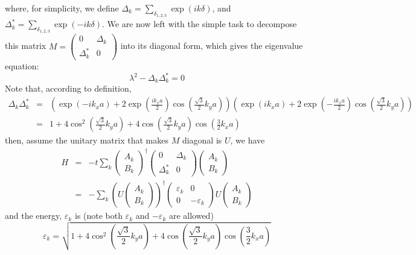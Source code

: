 \documentclass{article}
\begin{document}
where, for simplicity, we define $\Delta_k = \underset{\delta_{1, 2, 3}}{\sum} \exp (i k \delta)$, and $\Delta^{\ast}_k = \underset{\delta_{1, 2, 3}}{\sum} \exp (- i k \delta)$.
We are now left with the simple task to decompose this matrix $M = \left(\begin{array}{cc}  0 & \Delta_k\\  \Delta^{\ast}_k & 0\end{array}\right)$ into its diagonal form, which gives the eigenvalue equation:
\begin{equation}
    \lambda^2 -  \Delta_k \Delta^{\ast}_k = 0 
\end{equation}
Note that, according to definition,
\begin{eqnarray*}  \Delta_k \Delta^{\ast}_k & = & \left( \exp (- i k_x a) + 2 \exp \left(  \frac{i k_x a}{2} \right) \cos \left( \frac{\sqrt{3}}{2} k_y a \right)  \right) \left( \exp (i k_x a) + 2 \exp \left( - \frac{i k_x a}{2} \right)  \cos \left( \frac{\sqrt{3}}{2} k_y a \right) \right)\\  & = & 1 + 4 \cos^2 \left( \frac{\sqrt{3}}{2} k_y a \right) + 4 \cos \left(  \frac{\sqrt{3}}{2} k_y a \right) \cos \left( \frac{3}{2} k_x a \right)\end{eqnarray*}
then, assume the unitary matrix that makes $M$ diagonal is $U$, we have
\begin{eqnarray*}  H & = & - t \underset{k}{\sum} \left(\begin{array}{c}    A_k\\    B_k  \end{array}\right)^{\dag} \left(\begin{array}{cc}    0 & \Delta_k\\    \Delta^{\ast}_k & 0  \end{array}\right) \left(\begin{array}{c}    A_k\\    B_k  \end{array}\right)\\  & = & - \underset{k}{\sum} \left( U \left(\begin{array}{c}    A_k\\    B_k  \end{array}\right) \right)^{\dag} \left(\begin{array}{cc}    \varepsilon_k & 0\\    0 & - \varepsilon_k  \end{array}\right) U \left(\begin{array}{c}    A_k\\    B_k  \end{array}\right)\end{eqnarray*}
and the energy, $\varepsilon_k$ is (note both $\varepsilon_k$ and $-\varepsilon_k$ are allowed)
\begin{equation}
    \varepsilon_k = \sqrt{1 + 4 \cos^2 \left( \frac{\sqrt{3}}{2} k_y a \right) +4 \cos \left( \frac{\sqrt{3}}{2} k_y a \right) \cos \left( \frac{3}{2} k_x a\right)}
\end{equation}
\end{document}
